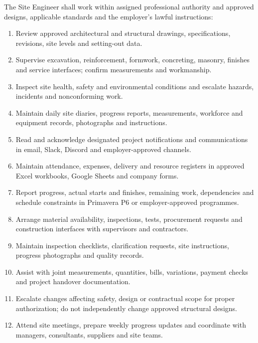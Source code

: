 The Site Engineer shall work within assigned professional authority and approved designs, applicable standards and the employer's lawful instructions:
\begin{enumerate}
\item Review approved architectural and structural drawings, specifications, revisions, site levels and setting-out data.
\item Supervise excavation, reinforcement, formwork, concreting, masonry, finishes and service interfaces; confirm measurements and workmanship.
\item Inspect site health, safety and environmental conditions and escalate hazards, incidents and nonconforming work.
\item Maintain daily site diaries, progress reports, measurements, workforce and equipment records, photographs and instructions.
\item Read and acknowledge designated project notifications and communications in email, Slack, Discord and employer-approved channels.
\item Maintain attendance, expenses, delivery and resource registers in approved Excel workbooks, Google Sheets and company forms.
\item Report progress, actual starts and finishes, remaining work, dependencies and schedule constraints in Primavera P6 or employer-approved programmes.
\item Arrange material availability, inspections, tests, procurement requests and construction interfaces with supervisors and contractors.
\item Maintain inspection checklists, clarification requests, site instructions, progress photographs and quality records.
\item Assist with joint measurements, quantities, bills, variations, payment checks and project handover documentation.
\item Escalate changes affecting safety, design or contractual scope for proper authorization; do not independently change approved structural designs.
\item Attend site meetings, prepare weekly progress updates and coordinate with managers, consultants, suppliers and site teams.
\end{enumerate}
